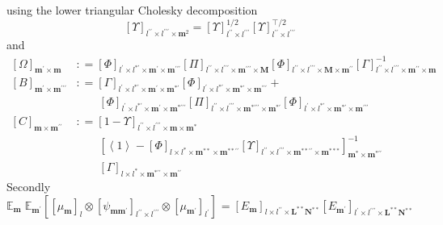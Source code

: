 \documentclass[preprint,12pt]{elsarticle}
\newcommand*{\M}[1]{\ensuremath{#1}\xspace}
\newcommand*{\x}{\times}
\newcommand*{\mi}[1]{\mathbf{#1}}
\newcommand*{\te}[2][]{\left\lbrack{#2}\right\rbrack_{#1}}
\newcommand*{\diag}[2][]{\left\langle{#2}\right\rangle_{#1}}
\newcommand*{\deq}{\M{\mathrel{\mathop:}=}}
\newcommand*{\evt}[3][]{\mathbb{E}_{#3}^{#1}\!#2}
\begin{document}
        using the lower triangular Cholesky decomposition
        \begin{equation*}
            \te[l^{\prime\prime}\x l^{\prime\prime\prime}\x\mi{m}^{2}]{\Upsilon}
            = \te[l^{\prime\prime}\x l^{\prime\prime\prime}]{\Upsilon}^{1/2} \te[l^{\prime\prime}\x l^{\prime\prime\prime}]{\Upsilon}^{\intercal/2}
        \end{equation*}
        and
        \begin{equation*}
            \begin{aligned}
                \te[\mi{m^{\prime}\x m}]{\Omega} &\deq 
                \te[l^{\prime}\x l^{*\prime}\x\mi{m^{\prime}}\x\mi{m^{\prime\prime\prime}}]{\Phi}
                \te[l^{\prime\prime}\x l^{\prime\prime\prime}\x\mi{m^{\prime\prime\prime}}\x\mi{M}]{\Pi}
                \te[l^{\prime\prime}\x l^{\prime\prime\prime}\x\mi{M}\x\mi{m^{\prime\prime}}]{\Phi}
                \te[l^{\prime\prime}\x l^{\prime\prime\prime}\x\mi{m^{\prime\prime}}\x\mi{m}]{\Gamma}^{-1} \\
                \te[\mi{m^{\prime}\x m^{\prime\prime\prime}}]{B} &\deq 
                \te[l^{\prime}\x l^{*\prime}\x\mi{m^{\prime}}\x\mi{m^{*\prime}}]{\Gamma}
                \te[l^{\prime}\x l^{*\prime}\x\mi{m^{*\prime}}\x\mi{m^{\prime\prime\prime}}]{\Phi} + \\
                &\phantom{\deq\ }\te[l^{\prime}\x l^{*\prime}\x\mi{m^{\prime}}\x\mi{m^{*\prime\prime\prime}}]{\Phi}
                \te[l^{\prime\prime}\x l^{\prime\prime\prime}\x\mi{m^{*\prime\prime\prime}}\x\mi{m^{*\prime}}]{\Pi}
                \te[l^{\prime}\x l^{*\prime}\x\mi{m^{*\prime}}\x\mi{m^{\prime\prime\prime}}]{\Phi} \\
                \te[\mi{m\x m^{\prime\prime}}]{C} &\deq 
                \te[l^{\prime\prime}\x l^{\prime\prime\prime}\x\mi{m}\x\mi{m^{*}}]{1-\Upsilon} \\
                &\phantom{\deq\ }
                \te[\mi{m^{*}}\x\mi{m^{*\prime\prime}}]{\diag[]{1}
                - \te[l\x l^{*}\x\mi{m^{**}}\x\mi{m^{**\prime\prime}}]{\Phi}\te[l^{\prime\prime}\x l^{\prime\prime\prime}\x\mi{m^{**\prime\prime}}\x\mi{m^{***}}]{\Upsilon}}^{-1} \\
                &\phantom{\deq\ }\te[l\x l^{*}\x\mi{m^{*\prime\prime}}\x\mi{m^{\prime\prime}}]{\Gamma}
            \end{aligned}
        \end{equation*}
        Secondly
        \begin{equation*}
            \evt{\;\evt{\te[]{\te[l]{\mu_{\mi{m}}} \otimes \te[l^{\prime\prime}\x l^{\prime\prime\prime}]{\psi_{\mi{mm^{\prime}}}} \otimes \te[l^{\prime}]{\mu_{\mi{m^{\prime}}}}}}{\mi{m^{\prime}}}}{\mi{m}} = 
            \te[l\x l^{\prime\prime}\x \mi{L^{**}N^{**}}]{E_{\mi{m}}}
            \te[l^{\prime}\x l^{\prime\prime\prime}\x \mi{L^{**}N^{**}}]{E_{\mi{m^{\prime}}}}
        \end{equation*}
\end{document}
